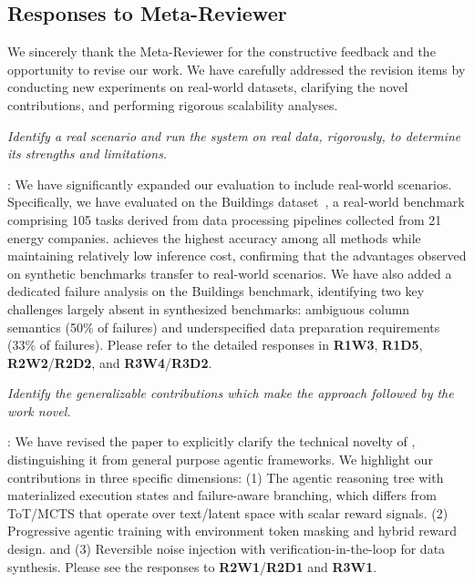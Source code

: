 \subsection*{Responses to Meta-Reviewer}

We sincerely thank the Meta-Reviewer for the constructive feedback and the opportunity to revise our work. 
We have carefully addressed the revision items by conducting new experiments on real-world datasets, clarifying the novel contributions, and performing rigorous scalability analyses.

\begin{shaded}
{
\emph{Identify a real scenario and run the system on real data, rigorously, to determine its strengths and limitations.}
}
\end{shaded}

: 
We have significantly expanded our evaluation to include real-world scenarios. Specifically, we have evaluated \sys on the Buildings dataset~\cite{sharma2023automatic}, a real-world benchmark comprising 105 tasks derived from data processing pipelines collected from 21 energy companies. \sys achieves the highest accuracy among all methods while maintaining relatively low inference cost, confirming that the advantages observed on synthetic benchmarks transfer to real-world scenarios. We have also added a dedicated failure analysis on the Buildings benchmark, identifying two key challenges largely absent in synthesized benchmarks: ambiguous column semantics (50\% of failures) and underspecified data preparation requirements (33\% of failures). Please refer to the detailed responses in \textbf{R1W3}, \textbf{R1D5}, \textbf{R2W2}/\textbf{R2D2}, and \textbf{R3W4}/\textbf{R3D2}.

\begin{shaded}
{
\emph{Identify the generalizable contributions which make the approach followed by the work novel.}
}
\end{shaded}

: 
We have revised the paper to explicitly clarify the technical novelty of \sys, distinguishing it from general purpose agentic frameworks. We highlight our contributions in three specific dimensions: (1) The agentic reasoning tree with materialized execution states and failure-aware branching, which differs from ToT/MCTS that operate over text/latent space with scalar reward signals. (2) Progressive agentic training with environment token masking and hybrid reward design. and (3) Reversible noise injection with verification-in-the-loop for data synthesis. Please see the responses to \textbf{R2W1}/\textbf{R2D1} and \textbf{R3W1}.

